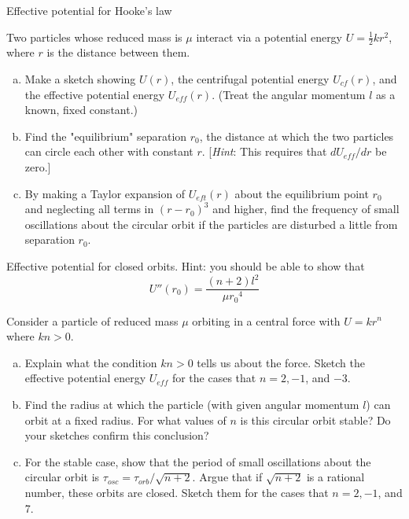 \documentclass[11pt,letterpaper,boxed]{../hmcpsetrhino}
\newcommand{\half}{\frac{1}{2}}
\begin{document}
\begin{problem}[iii]
Effective potential for Hooke's law\\
\begin{problem}[8.13]
Two particles whose reduced mass is $\mu$ interact via a potential energy $U = \half k r^2$, where $r$ is the distance between them.
\begin{enumerate}[(a)]
\item Make a sketch showing $U(r)$, the centrifugal potential energy $U_{cf}(r)$, and the effective potential energy $U_{eff}(r)$. (Treat the angular momentum $l$ as a known, fixed constant.)
\item Find the "equilibrium" separation $r_0$, the distance at which the two particles can circle each other with constant $r$. [\textit{Hint}: This requires that $dU_{eff}/dr$ be zero.] 
\item By making a Taylor expansion of $U_{eft}(r)$ about the equilibrium point $r_0$ and neglecting all terms in $(r-r_0)^3$ and higher, find the frequency of small oscillations about the circular orbit if the particles are disturbed a little from separation $r_0$.
\end{enumerate}
\end{problem}
\vspace{-0.45cm}
\end{problem}

\begin{solution}

\vfill
\end{solution}

\newpage

\begin{problem}[iv]
Effective potential for closed orbits. Hint: you should be able to show that 
\[	U''(r_0) = \frac{(n+2)l^2}{\mu {r_0}^4}\]
\begin{problem}[8.14]
Consider a particle of reduced mass $\mu$ orbiting in a central force with $U = kr^n$ where $kn > 0$.
\begin{enumerate}[(a)]
\item Explain what the condition $kn > 0$ tells us about the force. Sketch the effective potential energy $U_{eff}$ for the cases that $n =2, -1$, and $-3$.
\item Find the radius at which the particle (with given angular momentum $l$) can orbit at a fixed radius. For what values of $n$ is this circular orbit stable? Do your sketches confirm this conclusion?
\item For the stable case, show that the period of small oscillations about the circular orbit is $\tau_{osc} = \tau_{orb}/\sqrt{n+2}$. Argue that if $\sqrt{n+2}$ is a rational number, these orbits are closed. Sketch them for the cases that $n = 2, -1$, and 7.
\end{enumerate}
\end{problem}
\vspace{-0.45cm}
\end{problem}

\begin{solution}

\vfill
\end{solution}
\end{document}
